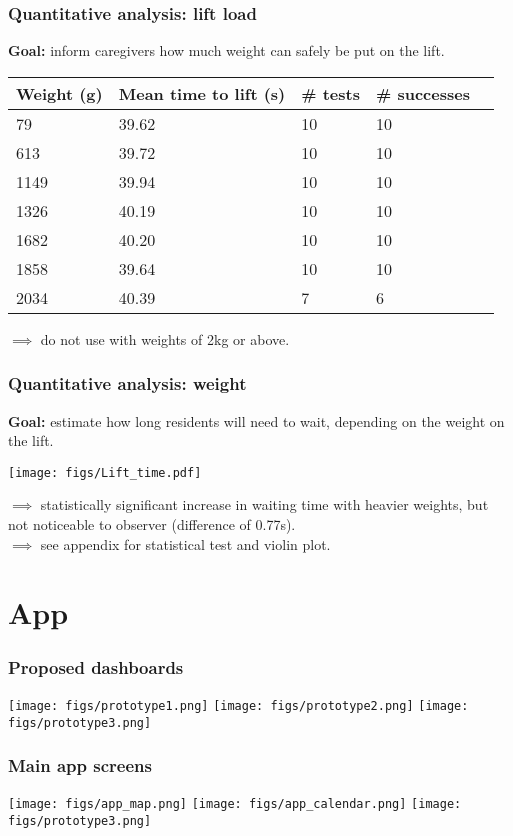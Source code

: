 \documentclass{beamer}
\begin{document}
\begin{frame}
  \frametitle{Quantitative analysis: lift load}
  {\bf Goal: } inform caregivers how much weight can safely be put on the lift.
  \begin{center}
    \begin{tabular}{llllr}
      {\bf Weight (g)} & {\bf Mean time to lift (s)} & {\bf \# tests} & {\bf \# successes}\\
      \hline
      79 & 39.62  & 10 & 10  \\
      613 & 39.72 & 10 & 10 \\
      1149 & 39.94 & 10 & 10  \\
      1326 & 40.19 & 10 & 10 \\
      1682 & 40.20 & 10 & 10 \\
      1858 & 39.64 & 10 & 10  \\
      2034 & 40.39 & 7 & 6
    \end{tabular}
  \end{center}
  $\implies$ do not use with weights of 2kg or above. 
\end{frame}

\begin{frame}
  \frametitle{Quantitative analysis: weight}
  {\bf Goal: } estimate how long residents will need to wait, depending on the weight on the lift.
  \begin{center}
    \texttt{[image: figs/Lift\_time.pdf]}
  \end{center}
  $\implies$ statistically significant increase in waiting time with heavier weights, but not noticeable to observer (difference of 0.77s). \\
  $\implies$ see appendix for statistical test and violin plot.
\end{frame}

\section{App}
\begin{frame}
  \frametitle{Proposed dashboards}
  \begin{center}
    \texttt{[image: figs/prototype1.png]}
    \texttt{[image: figs/prototype2.png]}
    \texttt{[image: figs/prototype3.png]}
  \end{center}
\end{frame}

\begin{frame}
  \frametitle{Main app screens}
    \begin{center}
    \texttt{[image: figs/app\_map.png]}
    \texttt{[image: figs/app\_calendar.png]}
    \texttt{[image: figs/prototype3.png]}
  \end{center}
\end{frame}
\end{document}
